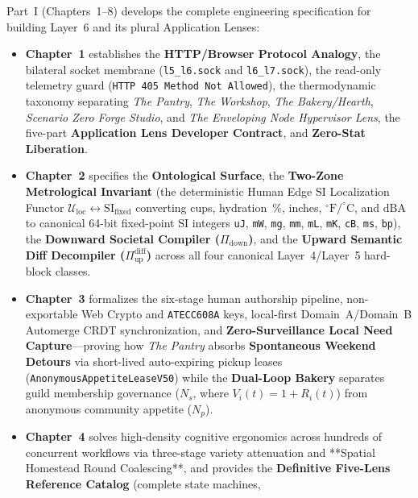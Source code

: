 Part~I (Chapters~1--8) develops the complete engineering specification for building Layer~6 and
its plural Application Lenses:
\begin{itemize}
    \item \textbf{Chapter~1} establishes the \textbf{HTTP/Browser Protocol Analogy}, the bilateral
          socket membrane (\texttt{l5\_l6.sock} and \texttt{l6\_l7.sock}), the read-only telemetry
          guard (\texttt{HTTP 405 Method Not Allowed}), the thermodynamic taxonomy separating
          \textit{The Pantry}, \textit{The Workshop}, \textit{The Bakery/Hearth}, \textit{Scenario
          Zero Forge Studio}, and \textit{The Enveloping Node Hypervisor Lens}, the five-part
          \textbf{Application Lens Developer Contract}, and \textbf{Zero-Stat Liberation}.
    \item \textbf{Chapter~2} specifies the \textbf{Ontological Surface}, the \textbf{Two-Zone
          Metrological Invariant} (the deterministic Human Edge SI Localization Functor
          $\mathcal{U}_{\mathrm{loc}} \leftrightarrow \mathrm{SI}_{\mathrm{fixed}}$ converting
          cups, hydration~$\%$, inches, $^\circ\mathrm{F}/^\circ\mathrm{C}$, and $\mathrm{dBA}$ to
          canonical 64-bit fixed-point SI integers \texttt{uJ}, \texttt{mW}, \texttt{mg},
          \texttt{mm}, \texttt{mL}, \texttt{mK}, \texttt{cB}, \texttt{ms}, \texttt{bp}), the
          \textbf{Downward Societal Compiler ($\Pi_{\mathrm{down}}$)}, and the \textbf{Upward
          Semantic Diff Decompiler ($\Pi_{\mathrm{up}}^{\mathrm{diff}}$)} across all four canonical
          Layer~4/Layer~5 hard-block classes.
    \item \textbf{Chapter~3} formalizes the six-stage human authorship pipeline, non-exportable Web
          Crypto and \texttt{ATECC608A} keys, local-first Domain~A/Domain~B Automerge CRDT
          synchronization, and \textbf{Zero-Surveillance Local Need Capture}---proving how
          \textit{The Pantry} absorbs \textbf{Spontaneous Weekend Detours} via short-lived
          auto-expiring pickup leases (\texttt{AnonymousAppetiteLeaseV50}) while the
          \textbf{Dual-Loop Bakery} separates guild membership governance ($N_s$, where
          $V_i(t)=1+R_i(t)$) from anonymous community appetite ($N_p$).
    \item \textbf{Chapter~4} solves high-density cognitive ergonomics across hundreds of concurrent
          workflows via three-stage variety attenuation and **Spatial Homestead Round Coalescing**,
          and provides the \textbf{Definitive Five-Lens Reference Catalog} (complete state machines,

\end{itemize}
